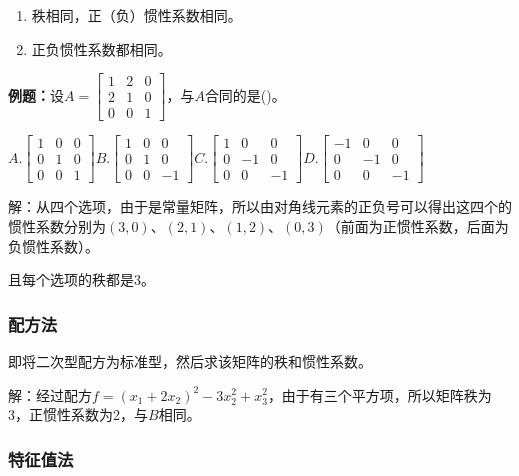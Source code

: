 \documentclass[UTF8, 12pt]{ctexart}
\begin{document}
\begin{enumerate}
    \item 秩相同，正（负）惯性系数相同。
    \item 正负惯性系数都相同。
\end{enumerate}

\textbf{例题：}设$A=\left[\begin{array}{ccc}
    1 & 2 & 0 \\
    2 & 1 & 0 \\
    0 & 0 & 1
\end{array}\right]$，与$A$合同的是()。

$A.\left[\begin{array}{ccc}
    1 & 0 & 0 \\
    0 & 1 & 0 \\
    0 & 0 & 1
\end{array}\right]$\;$B.\left[\begin{array}{ccc}
    1 & 0 & 0 \\
    0 & 1 & 0 \\
    0 & 0 & -1
\end{array}\right]$\;$C.\left[\begin{array}{ccc}
    1 & 0 & 0 \\
    0 & -1 & 0 \\
    0 & 0 & -1
\end{array}\right]$\;$D.\left[\begin{array}{ccc}
    -1 & 0 & 0 \\
    0 & -1 & 0 \\
    0 & 0 & -1
\end{array}\right]$ \medskip

解：从四个选项，由于是常量矩阵，所以由对角线元素的正负号可以得出这四个的惯性系数分别为$(3,0)$、$(2,1)$、$(1,2)$、$(0,3)$（前面为正惯性系数，后面为负惯性系数）。

且每个选项的秩都是3。

\subsubsection{配方法}

即将二次型配方为标准型，然后求该矩阵的秩和惯性系数。

解：经过配方$f=(x_1+2x_2)^2-3x_2^2+x_3^2$，由于有三个平方项，所以矩阵秩为3，正惯性系数为2，与$B$相同。

\subsubsection{特征值法}
\end{document}

